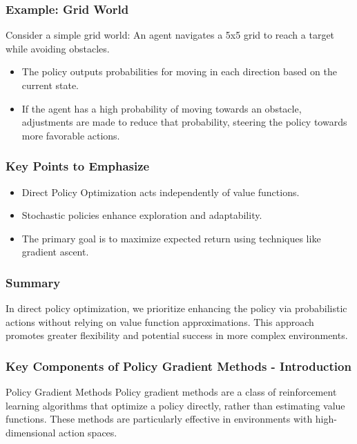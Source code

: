 \documentclass[aspectratio=169]{beamer}
\begin{document}
\begin{frame}[fragile]
    \frametitle{Example: Grid World}
    \begin{block}{Consider a simple grid world:}
        An agent navigates a 5x5 grid to reach a target while avoiding obstacles. 

        \begin{itemize}
            \item The policy outputs probabilities for moving in each direction based on the current state.
            \item If the agent has a high probability of moving towards an obstacle, adjustments are made to reduce that probability, steering the policy towards more favorable actions.
        \end{itemize}
    \end{block}
\end{frame}

\begin{frame}[fragile]
    \frametitle{Key Points to Emphasize}
    \begin{itemize}
        \item Direct Policy Optimization acts independently of value functions.
        \item Stochastic policies enhance exploration and adaptability.
        \item The primary goal is to maximize expected return using techniques like gradient ascent.
    \end{itemize}
\end{frame}

\begin{frame}[fragile]
    \frametitle{Summary}
    In direct policy optimization, we prioritize enhancing the policy via probabilistic actions without relying on value function approximations. This approach promotes greater flexibility and potential success in more complex environments.
\end{frame}

\begin{frame}[fragile]
    \frametitle{Key Components of Policy Gradient Methods - Introduction}
    \begin{block}{Policy Gradient Methods}
        Policy gradient methods are a class of reinforcement learning algorithms that optimize a policy directly, rather than estimating value functions. These methods are particularly effective in environments with high-dimensional action spaces.
    \end{block}
\end{frame}
\end{document}
